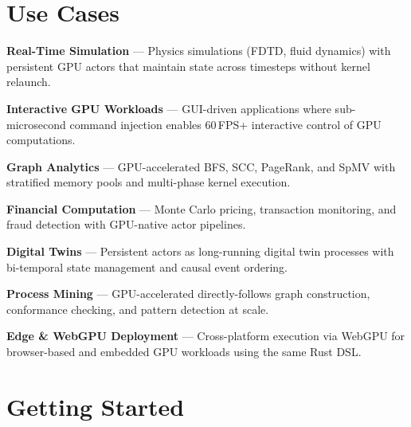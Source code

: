 \documentclass[11pt,a4paper]{article}
\begin{document}
\section{Use Cases}

\begin{tcolorbox}[keybox={Primary Use Cases}]
\begin{description}[leftmargin=1em, labelwidth=1em, font=\color{brand}\bfseries]
  \item[$\blacktriangleright$] \textbf{Real-Time Simulation} ---
    Physics simulations (FDTD, fluid dynamics) with persistent GPU actors
    that maintain state across timesteps without kernel relaunch.

  \item[$\blacktriangleright$] \textbf{Interactive GPU Workloads} ---
    GUI-driven applications where sub-microsecond command injection enables
    60\,FPS+ interactive control of GPU computations.

  \item[$\blacktriangleright$] \textbf{Graph Analytics} ---
    GPU-accelerated BFS, SCC, PageRank, and SpMV with stratified memory pools
    and multi-phase kernel execution.

  \item[$\blacktriangleright$] \textbf{Financial Computation} ---
    Monte Carlo pricing, transaction monitoring, and fraud detection with
    GPU-native actor pipelines.

  \item[$\blacktriangleright$] \textbf{Digital Twins} ---
    Persistent actors as long-running digital twin processes with
    bi-temporal state management and causal event ordering.

  \item[$\blacktriangleright$] \textbf{Process Mining} ---
    GPU-accelerated directly-follows graph construction, conformance checking,
    and pattern detection at scale.

  \item[$\blacktriangleright$] \textbf{Edge \& WebGPU Deployment} ---
    Cross-platform execution via WebGPU for browser-based and embedded GPU
    workloads using the same Rust DSL.
\end{description}
\end{tcolorbox}

\newpage
\section{Getting Started}
\end{document}
